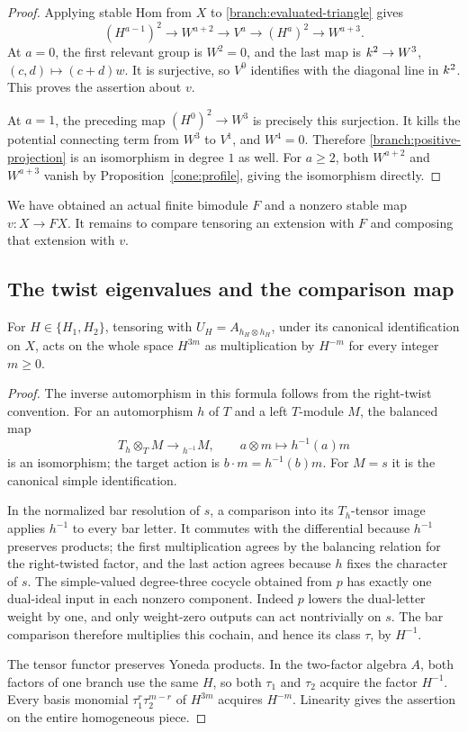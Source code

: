 \begin{proof}
Applying stable Hom from $X$ to \eqref{branch:evaluated-triangle} gives
\[
 (H^{a-1})^2\longrightarrow W^{a+2}
 \longrightarrow V^a\longrightarrow(H^a)^2
 \longrightarrow W^{a+3}.
\]
At $a=0$, the first relevant group is $W^2=0$, and the last map is
$k^2\to W^3$, $(c,d)\mapsto(c+d)w$.  It is surjective, so $V^0$
identifies with the diagonal line in $k^2$.  This proves the assertion
about $v$.

At $a=1$, the preceding map
$(H^0)^2\to W^3$ is precisely this surjection.  It kills the
potential connecting term from $W^3$ to $V^1$, and $W^4=0$.  Therefore
\eqref{branch:positive-projection} is an isomorphism in degree $1$ as
well.  For $a\ge2$, both $W^{a+2}$ and $W^{a+3}$ vanish by
Proposition~\ref{cone:profile}, giving the isomorphism directly.
\end{proof}

We have obtained an actual finite bimodule $F$ and a nonzero stable map
$v:X\to FX$.  It remains to compare tensoring an extension with $F$ and
composing that extension with $v$.

\subsection{The twist eigenvalues and the comparison map}

\begin{lemma}
 \label{branch:twist}
 For $H\in\{H_1,H_2\}$, tensoring with
 $U_H=A_{h_H\otimes h_H}$, under its canonical identification on $X$,
 acts on the whole space $H^{3m}$ as multiplication by $H^{-m}$
 for every integer $m\ge0$.
\end{lemma}

\begin{proof}
The inverse automorphism in this formula follows from the right-twist
convention.  For an automorphism $h$ of $T$ and a left $T$-module $M$,
the balanced map
\[
 T_h\otimes_TM\longrightarrow {}_{h^{-1}}M,
 \qquad a\otimes m\longmapsto h^{-1}(a)m
\]
is an isomorphism; the target action is $b\cdot m=h^{-1}(b)m$.
For $M=s$ it is the canonical simple identification.

In the normalized bar resolution of $s$, a comparison into its
$T_h$-tensor image applies $h^{-1}$ to every bar letter.  It commutes
with the differential because $h^{-1}$ preserves products; the first
multiplication agrees by the balancing relation for the right-twisted
factor, and the last action agrees because $h$ fixes the character of
$s$.  The simple-valued degree-three cocycle obtained from $p$ has
exactly one dual-ideal input in each nonzero component.  Indeed $p$
lowers the dual-letter weight by one, and only weight-zero outputs can
act nontrivially on $s$.  The bar comparison therefore multiplies this
cochain, and hence its class $\tau$, by $H^{-1}$.

The tensor functor preserves Yoneda products.  In the two-factor algebra
$A$, both factors of one branch use the same $H$, so both $\tau_1$ and
$\tau_2$ acquire the factor $H^{-1}$.  Every basis monomial
$\tau_1^r\tau_2^{m-r}$ of $H^{3m}$ acquires $H^{-m}$.
Linearity gives the assertion on the entire homogeneous piece.
\end{proof}

